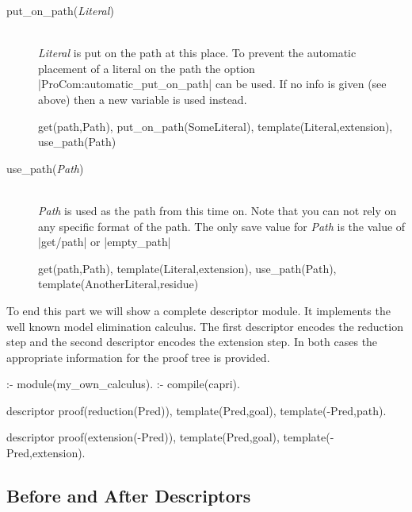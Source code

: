 \begin{description}
  \item [put\_on\_path({\em Literal})]\ 
    \\
    {\em Literal}\/ is put on the path at this place. To prevent the automatic
    placement of a literal on the path the option
    |ProCom:automatic_put_on_path| can be used. If no info is given (see
    above) then a new variable is used instead.

    \begin{BoxedSample}
      get(path,Path),
      put\_on\_path(SomeLiteral),
      template(Literal,extension),
      use\_path(Path)%
    \end{BoxedSample}
 
  \item [use\_path({\em Path})]\ 
    \\
    {\em Path}\/ is used as the path from this time on.  Note that you can not
    rely on any specific format of the path. The only save value for {\em
      Path} is the value of |get/path| or |empty_path|

    \begin{BoxedSample}
      get(path,Path),
      template(Literal,extension),
      use\_path(Path),
      template(AnotherLiteral,residue)%
    \end{BoxedSample}
 
\end{description}

To end this part we will show a complete \CaPrI{} descriptor module. It
implements the well known model elimination calculus. The first descriptor
encodes the reduction step and the second descriptor encodes the extension
step. In both cases the appropriate information for the proof tree is
provided. 

\begin{BoxedSample}
:- module(my\_own\_calculus).
:- compile(capri).

descriptor
        proof(reduction(Pred)),
        template(Pred,goal),
        template(-Pred,path).

descriptor
        proof(extension(-Pred)),
        template(Pred,goal),
        template(-Pred,extension).
\end{BoxedSample}

\iffalse
\subsection{Before and After Descriptors}

